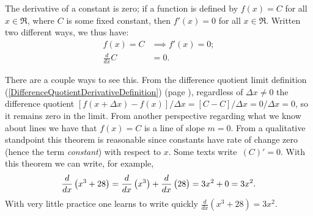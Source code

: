 \begin{theorem}
The derivative of a constant is zero; if a function
is defined by $f(x)=C$ for all $x\in\Re$, where $C$
is some fixed constant, then $f'(x)=0$ for all $x\in\Re$.
Written two different ways, we thus have:
\begin{align}
f(x)=C&\implies f'(x)=0;\\
\frac{d}{dx}C&=0.\label{DerivativeOfAConstant}\end{align}\end{theorem}
There are a couple ways to see this. From the difference quotient
limit definition (\ref{DifferenceQuotientDerivativeDefinition})
(page \pageref{DifferenceQuotientDerivativeDefinition}), regardless
of $\Delta x\ne0$ the
difference quotient $[f(x+\Delta x)-f(x)]/\Delta x=[C-C]/\Delta x
=0/\Delta x=0$,
so it remains zero in the limit.  
From another perspective regarding
what we know about lines
we have that $f(x)=C$ is a line of slope $m=0$.
From a qualitative standpoint this theorem is reasonable
since constants have rate of change
zero (hence the term {\it constant}) 
with respect to $x$. Some texts write\footnotemark \ $(C)'=0$.
%
%
With this theorem we can write,
for example,
$$\frac{d}{dx}\left(x^3+28\right)=\frac{d}{dx}\left(x^3\right)+\frac{d}{dx}
\left(\vphantom{x^3}28\right)=3x^2+0=3x^2.$$
With very little practice one learns to write
quickly ${\frac{d}{dx}\left(x^3+28\right)=3x^2}$.


